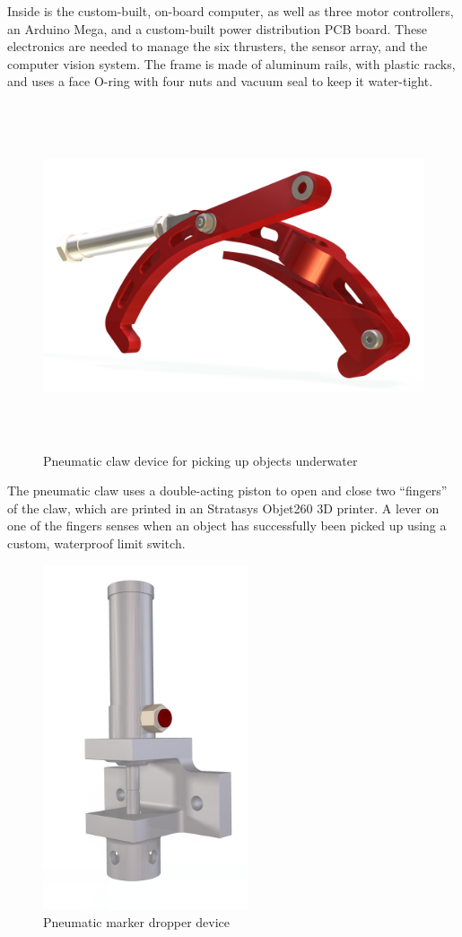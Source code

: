 \documentclass[12pt, landscape]{article}
\begin{document}
Inside is the custom-built, on-board computer, as well as three motor controllers, an Arduino Mega, and a custom-built power distribution PCB board.  These electronics are needed to manage the six thrusters, the sensor array, and the computer vision system.  The frame is made of aluminum rails, with plastic racks, and uses a face O-ring with four nuts and vacuum seal to keep it water-tight. 

\begin{figure}[H]
\centering
\includegraphics[height=4in]{media/GRABBER-RENDER-ALPHA.png}
\caption{Pneumatic claw device for picking up objects underwater}
\label{grabber}
\end{figure}

The pneumatic claw uses a double-acting piston to open and close two ``fingers'' of the claw, which are printed in an Stratasys Objet260 3D printer.  A lever on one of the fingers senses when an object has successfully been picked up using a custom, waterproof limit switch.  

\begin{figure}[H]
\centering
\includegraphics[height=4in]{media/marker_dropper.png}
\caption{Pneumatic marker dropper device}
\label{marker}
\end{figure}
\end{document}
